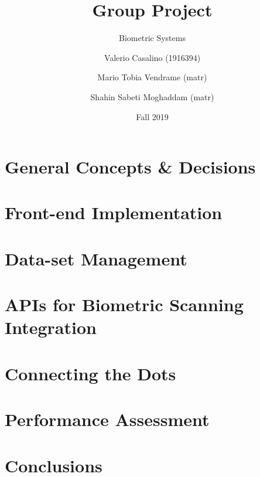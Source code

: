 \documentclass[t]{beamer}
\title
{
\LARGE Group Project
}
\subtitle
{
Biometric Systems
}
\author[Casalino, Vendrame, Moghaddam] 
{
    Valerio Casalino (1916394)\inst{1} \and 
    Mario Tobia Vendrame (matr)\inst{1} \and
    Shahin Sabeti Moghaddam (matr)\inst{1}    
}
\institute
{
\inst{1}
{\color{black} Cybersecurity Master @ Sapienza Università di Roma}
}
\date{
Fall 2019
}
\begin{document}
	
	\frame{\titlepage}

	\section{General Concepts \& Decisions}
		
	
	\section{Front-end Implementation}

	\section{Data-set Management}
	
	

	\section{APIs for Biometric Scanning Integration}
	
	\section{Connecting the Dots}
	
	\section{Performance Assessment}
	
	\section{Conclusions}
\end{document}
